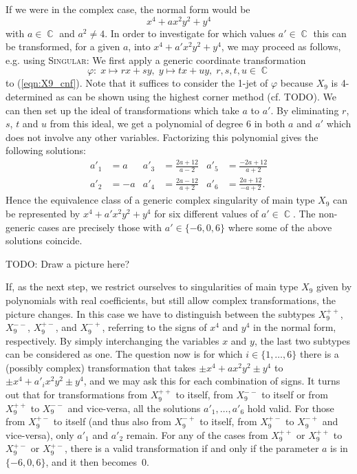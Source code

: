 \documentclass[noend]{amsproc}
\theoremstyle{definition}
\newcommand{\Singular}{\textsc{Singular}}
\DeclareMathOperator{\C}{\mathbb{C}}
\begin{document}
If we were in the complex case, the normal form would be
\begin{equation}\label{eqn:X9_cnf}
x^4 +ax^2y^2 +y^4
\end{equation}
with $a \in \C$ and $a^2 \neq 4$. In order to investigate for which values
$a' \in \C$ this can be transformed, for a given $a$, into
$x^4 +a'x^2y^2 +y^4$, we may proceed as follows, e.g. using \Singular:
We first apply a generic coordinate transformation
\[
\varphi: \; x \mapsto rx+sy, \; y \mapsto tx+uy, \; r,s,t,u \in \C
\]
to (\ref{eqn:X9_cnf}). Note that it suffices to consider the 1-jet of $\varphi$
because $X_9$ is 4-determined as can be shown using the highest corner method
(cf. TODO). We can then set up the ideal of transformations which take $a$ to
$a'$. By eliminating $r$, $s$, $t$ and $u$ from this ideal, we get a polynomial
of degree 6 in both $a$ and $a'$ which does not involve any other variables.
Factorizing this polynomial gives the following solutions:
\begin{align*}
a'_1 &= a  & a'_3 &= \frac{2a+12}{a-2} & a'_5 &= \frac{-2a+12}{a+2} \\
a'_2 &= -a & a'_4 &= \frac{2a-12}{a+2} & a'_6 &= \frac{2a+12}{-a+2}.
\end{align*}
Hence the equivalence class of a generic complex singularity of main type $X_9$
can be represented by $x^4 +a'x^2y^2 +y^4$ for six different values of
$a' \in \C$. The non-generic cases are precisely those with
$a' \in \{-6, 0, 6\}$ where some of the above solutions coincide.

TODO: Draw a picture here?

If, as the next step, we restrict ourselves to singularities of main type $X_9$
given by polynomials with real coefficients, but still allow complex
transformations, the picture changes. In this case we have to distinguish
between the subtypes $X_9^{++}$, $X_9^{--}$, $X_9^{+-}$, and $X_9^{-+}$,
referring to the signs of $x^4$ and $y^4$ in the normal form, respectively. By
simply interchanging the variables $x$ and $y$, the last two subtypes can be
considered as one.
The question now is for which $i \in \{1, \ldots, 6\}$ there is a (possibly
complex) transformation that takes
$\pm x^4 +ax^2y^2 \pm y^4$ to $\pm x^4 +a'_i x^2y^2 \pm y^4$, and we may
ask this for each combination of signs.
It turns out that for transformations from $X_9^{++}$ to itself, from
$X_9^{--}$ to itself or from $X_9^{++}$ to $X_9^{--}$ and vice-versa, all the
solutions $a'_1, \ldots, a'_6$ hold valid. For those from $X_9^{+-}$ to
itself (and thus also from $X_9^{-+}$ to itself, from $X_9^{+-}$ to
$X_9^{-+}$
and vice-versa), only $a'_1$ and $a'_2$ remain. For any of the cases from
$X_9^{++}$ or $X_9^{++}$ to $X_9^{+-}$ or $X_9^{+-}$, there is a valid
transformation if and only if the parameter $a$ is in $\{-6, 0, 6\}$, and it
then becomes~$0$.
\end{document}
